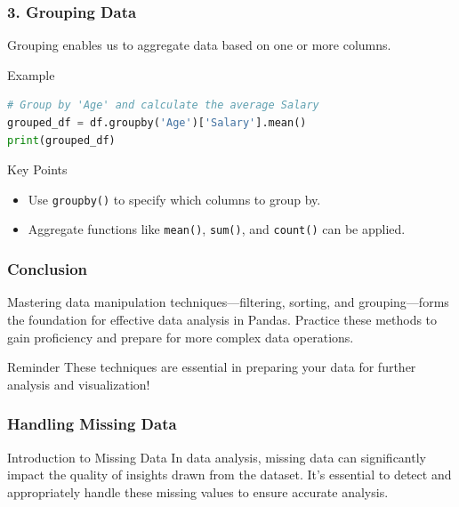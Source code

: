 \documentclass{beamer}
\begin{document}
\begin{frame}[fragile]
    \frametitle{3. Grouping Data}
    Grouping enables us to aggregate data based on one or more columns.

    \begin{block}{Example}
        \begin{lstlisting}[language=Python]
# Group by 'Age' and calculate the average Salary
grouped_df = df.groupby('Age')['Salary'].mean()
print(grouped_df)
        \end{lstlisting}
    \end{block}
    
    \begin{block}{Key Points}
        \begin{itemize}
            \item Use \texttt{groupby()} to specify which columns to group by.
            \item Aggregate functions like \texttt{mean()}, \texttt{sum()}, and \texttt{count()} can be applied.
        \end{itemize}
    \end{block}
\end{frame}

\begin{frame}[fragile]
    \frametitle{Conclusion}
    Mastering data manipulation techniques—filtering, sorting, and grouping—forms the foundation for effective data analysis in Pandas. Practice these methods to gain proficiency and prepare for more complex data operations.

    \begin{block}{Reminder}
        These techniques are essential in preparing your data for further analysis and visualization!
    \end{block}
\end{frame}

\begin{frame}
    \frametitle{Handling Missing Data}
    \begin{block}{Introduction to Missing Data}
        In data analysis, missing data can significantly impact the quality of insights drawn from the dataset. 
        It’s essential to detect and appropriately handle these missing values to ensure accurate analysis.
    \end{block}
\end{frame}
\end{document}
